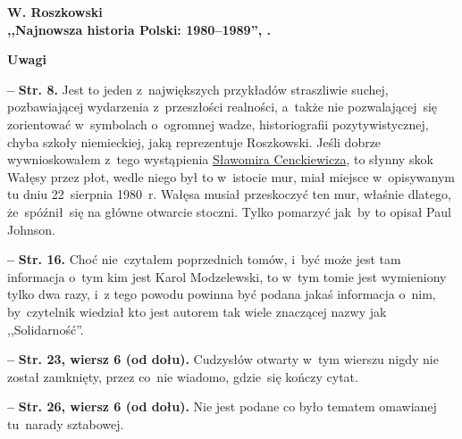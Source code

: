 \documentclass[a4paper,11pt]{article}
\newcommand{\spaceOne}{2em}
\newcommand{\tb}{\textbf}
\newcommand{\noi}{\noindent}
\newcommand{\start}{\noi \tb{--} {}}
\newcommand{\Center}[1]{\begin{center} #1 \end{center}}
\newcommand{\CenterTB}[1]{\Center{\tb{#1}}}
\newcommand{\Str}[1]{\tb{Str. #1.}}
\newcommand{\StrWd}[2]{\tb{Str. #1, wiersz #2 (od dołu).}}
\newcommand{\Work}[1]{ \begin{center} {\large \tb{#1}} \end{center} }
\begin{document}
\vspace{\spaceOne}



\Work{
  W. Roszkowski \\
  ,,Najnowsza historia Polski: 1980--1989'', \cite{Ros11f}.}


\CenterTB{Uwagi}

\start \Str{8} Jest to jeden z~największych przykładów straszliwie
suchej, pozbawiającej wydarzenia z~przeszłości realności, a~także nie
pozwalającej~się zorientować w~symbolach o~ogromnej wadze,
historiografii pozytywistycznej, chyba szkoły niemieckiej, jaką
reprezentuje Roszkowski. Jeśli dobrze wywnioskowałem z~tego
wystąpienia
\href{https://www.youtube.com/watch?v=6B93_3CCMac}{Sławomira
  Cenckiewicza}, to słynny skok Wałęsy przez płot, wedle niego był to
w~istocie mur, miał miejsce w~opisywanym tu dniu 22~sierpnia 1980~r.
Wałęsa musiał przeskoczyć ten mur, właśnie dlatego, że~spóźnił~się na
główne otwarcie stoczni. Tylko pomarzyć jak~by to opisał Paul Johnson.

\start \Str{16} Choć nie~czytałem poprzednich tomów, i~być może jest
tam informacja o~tym kim jest Karol Modzelewski, to w~tym tomie jest
wymieniony tylko dwa razy, i~z tego powodu powinna być podana jakaś
informacja o~nim, by~czytelnik wiedział kto jest autorem tak wiele
znaczącej nazwy jak ,,Solidarność''.

\start \StrWd{23}{6} Cudzysłów otwarty w~tym wierszu nigdy nie został
zamknięty, przez co~nie wiadomo, gdzie~się kończy cytat.

\start \StrWd{26}{6} Nie jest podane co było tematem omawianej
tu~narady sztabowej.


\end{document}
